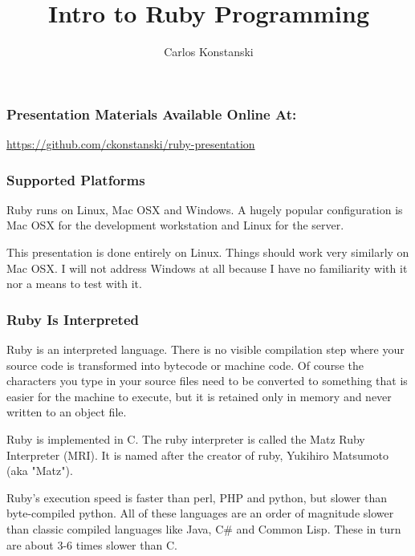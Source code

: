 \documentclass[helvetica,english,utf8,notitle,nologo]{beamer}
\begin{document}
\title{Intro to Ruby Programming}
\author{Carlos Konstanski}

\frame{\titlepage}

\begin{frame}
  \frametitle{Presentation Materials Available Online At:}
  \href{url}{https://github.com/ckonstanski/ruby-presentation}
\end{frame}

\begin{frame}
  \frametitle{Supported Platforms}

  Ruby runs on Linux, Mac OSX and Windows. A hugely popular
  configuration is Mac OSX for the development workstation and Linux
  for the server.

  This presentation is done entirely on Linux. Things should work very
  similarly on Mac OSX. I will not address Windows at all because I
  have no familiarity with it nor a means to test with it.

\end{frame}

\begin{frame}
  \frametitle{Ruby Is Interpreted}

  Ruby is an interpreted language. There is no visible compilation
  step where your source code is transformed into bytecode or machine
  code. Of course the characters you type in your source files need to
  be converted to something that is easier for the machine to execute,
  but it is retained only in memory and never written to an object
  file.

  Ruby is implemented in C. The ruby interpreter is called the Matz
  Ruby Interpreter (MRI). It is named after the creator of ruby,
  Yukihiro Matsumoto (aka "Matz").

  Ruby's execution speed is faster than perl, PHP and python, but
  slower than byte-compiled python. All of these languages are an
  order of magnitude slower than classic compiled languages like Java,
  C\# and Common Lisp. These in turn are about 3-6 times slower than
  C.
\end{frame}
\end{document}
